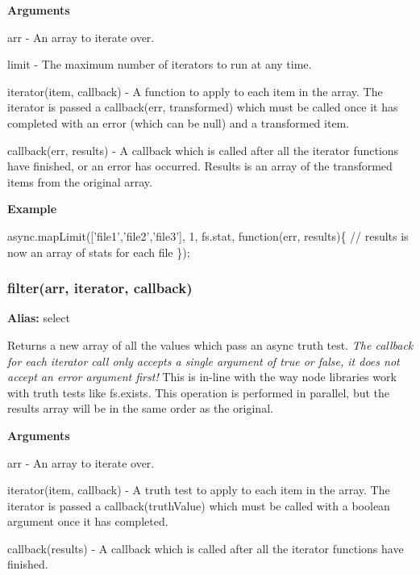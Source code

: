 {\bfseries Arguments}


\begin{DoxyItemize}
\item arr -\/ An array to iterate over.
\item limit -\/ The maximum number of iterators to run at any time.
\item iterator(item, callback) -\/ A function to apply to each item in the array. The iterator is passed a callback(err, transformed) which must be called once it has completed with an error (which can be null) and a transformed item.
\item callback(err, results) -\/ A callback which is called after all the iterator functions have finished, or an error has occurred. Results is an array of the transformed items from the original array.
\end{DoxyItemize}

{\bfseries Example}


\begin{DoxyCode}
async.mapLimit(['file1','file2','file3'], 1, fs.stat, function(err, results)\{
    // results is now an array of stats for each file
\});
\end{DoxyCode}
 



\label{_filter}%
 \subsubsection*{filter(arr, iterator, callback)}

{\bfseries Alias\+:} select

Returns a new array of all the values which pass an async truth test. {\itshape The callback for each iterator call only accepts a single argument of true or false, it does not accept an error argument first!} This is in-\/line with the way node libraries work with truth tests like fs.\+exists. This operation is performed in parallel, but the results array will be in the same order as the original.

{\bfseries Arguments}


\begin{DoxyItemize}
\item arr -\/ An array to iterate over.
\item iterator(item, callback) -\/ A truth test to apply to each item in the array. The iterator is passed a callback(truth\+Value) which must be called with a boolean argument once it has completed.
\item callback(results) -\/ A callback which is called after all the iterator functions have finished.
\end{DoxyItemize}


